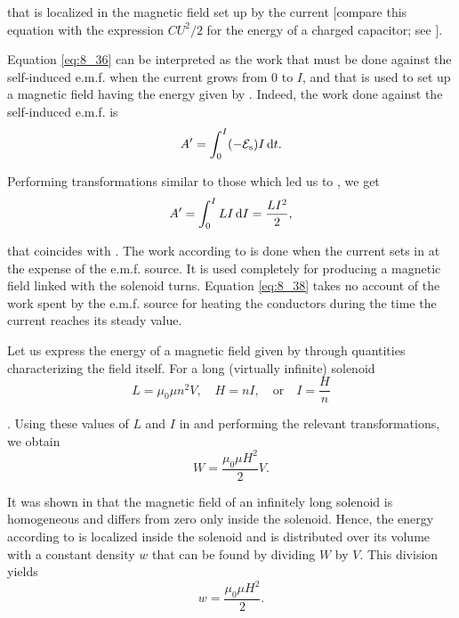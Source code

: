 \noindent
that is localized in the magnetic field set up by the current [compare this equation with the expression $CU^2/2$ for the energy of a charged capacitor; see ].

Equation \eqref{eq:8_36} can be interpreted as the work that must be done against the self-induced e.m.f. when the current grows from $0$ to $I$, and that is used to set up a magnetic field having the energy given by .
Indeed, the work done against the self-induced e.m.f. is
\begin{equation*}
	A' = \int_0^I (-\mathcal{E}_{\text{s}}) I\, \mathrm{d} t.
\end{equation*}

\noindent
Performing transformations similar to those which led us to , we get
\begin{equation}\label{eq:8_38}
	A' = \int_0^I LI\, \mathrm{d} I = \frac{LI^2}{2},
\end{equation}

\noindent
that coincides with .
The work according to  is done when the current sets in at the expense of the e.m.f. source.
It is used completely for producing a magnetic field linked with the solenoid turns.
Equation \eqref{eq:8_38} takes no account of the work
spent by the e.m.f. source for heating the conductors during the time the current reaches its steady value.

Let us express the energy of a magnetic field given by  through quantities characterizing the field itself.
For a long (virtually infinite) solenoid
\begin{equation*}
	L = \mu_0\mu n^2V,\quad H=nI,\quad\text{or}\quad I=\frac{H}{n}
\end{equation*}

.
Using these values of $L$ and $I$ in  and performing the relevant transformations, we obtain
\begin{equation}\label{eq:8_39}
	W = \frac{\mu_0 \mu H^2}{2} V.
\end{equation}

It was shown in  that the magnetic field of an infinitely long solenoid is homogeneous and differs from zero only inside the solenoid.
Hence, the energy according to  is localized inside the solenoid and is distributed over its volume with a constant density $w$ that can be found by dividing $W$ by $V$.
This division yields
\begin{equation}\label{eq:8_40}
	w = \frac{\mu_0 \mu H^2}{2}.
\end{equation}


